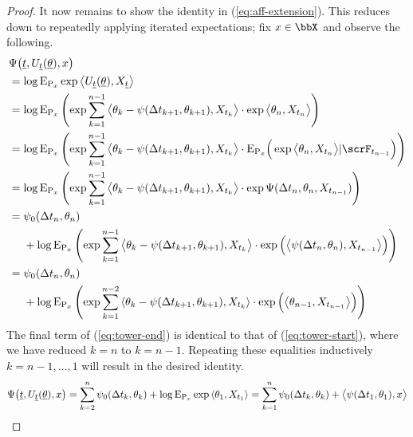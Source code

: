 \begin{proof}
  It now remains to show the identity in (\ref{eq:aff-extension}).
  This reduces down to repeatedly applying iterated expectations; fix $\stateVar \in \stateSpace$ and observe the following.
  \begin{align}
    \notag
    &\aff\big(\underline t, \twistToMoment_{\underline t}(\underline\twistVar), \stateVar\big) \\
    \notag
    &=\log\Exp_{\Prb_\stateVar} \exp\bprj{\twistToMoment_{\underline t}(\underline\twistVar)}{\X_{\underline t}} \\
    \label{eq:tower-start}
    &= \log\Exp_{\Prb_\stateVar}\left( \exp\sum_{k=1}^{n-1} \bprj{\twistVar_k - \affPart(\Delta t_{k+1}, \twistVar_{k+1})}{\X_{t_k}} \cdot \exp\bprj{\twistVar_n}{\X_{t_n}} \right) \\
    \notag
    &= \log\Exp_{\Prb_\stateVar}\left( \exp\sum_{k=1}^{n-1} \bprj{\twistVar_k - \affPart(\Delta t_{k+1}, \twistVar_{k+1})}{\X_{t_k}} \cdot \Exp_{\Prb_\stateVar}\Big(\exp\bprj{\twistVar_n}{\X_{t_n}} |\scrF_{t_{n-1}} \Big) \right) \\
    \notag
    &= \log\Exp_{\Prb_\stateVar}\left( \exp\sum_{k=1}^{n-1} \bprj{\twistVar_k - \affPart(\Delta t_{k+1}, \twistVar_{k+1})}{\X_{t_k}} \cdot \exp\aff(\Delta t_n, \twistVar_n, \X_{t_{n-1}})\right) \\
    \notag
    &= \begin{aligned}[t]
      &\affPart_0(\Delta t_n, \twistVar_n) \\
      &+ \log\Exp_{\Prb_\stateVar}\left( \exp\sum_{k=1}^{n-1} \bprj{\twistVar_k - \affPart(\Delta t_{k+1}, \twistVar_{k+1})}{\X_{t_k}} \cdot \exp\Big( \bprj{\affPart(\Delta t_n, \twistVar_n)}{\X_{t_{n-1}}} \Big)   \right) 
    \end{aligned} \\
    \label{eq:tower-end}
    &= \begin{aligned}[t]
      &\affPart_0(\Delta t_n, \twistVar_n) \\
      &+ \log\Exp_{\Prb_\stateVar}\left( \exp\sum_{k=1}^{n-2} \prj{\twistVar_k - \affPart(\Delta t_{k+1}, \twistVar_{k+1})}{\X_{t_k}} \cdot \exp\Big( \bprj{\twistVar_{n-1}}{\X_{t_{n-1}}} \Big)   \right) 
    \end{aligned}
  \end{align}
  The final term of (\ref{eq:tower-end}) is identical to that of (\ref{eq:tower-start}), where we have reduced $k = n$ to $k = n-1$.
  Repeating these equalities inductively $k = n -1, \ldots, 1$ will result in the desired identity.
  \begin{equation*}
    \Psi\big(\underline t, U_{\underline t}(\underline{\theta}), x\big) =  \sum_{k=2}^n \psi_0(\Delta t_k, \theta_k)  + \log{\operatorname{E}}_{{\operatorname{P}}_x} \exp{\langle \theta_1 , X_{t_1} \rangle} = \sum_{k=1}^n \psi_0(\Delta t_k, \theta_k) + {\big\langle \psi(\Delta t_1, \theta_1) , x \big\rangle}
  \end{equation*}
\end{proof}
